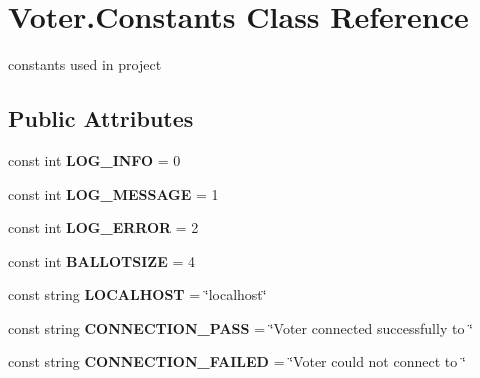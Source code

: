 \hypertarget{class_voter_1_1_constants}{}\section{Voter.\+Constants Class Reference}
\label{class_voter_1_1_constants}


constants used in project  


\subsection*{Public Attributes}
\begin{DoxyCompactItemize}
\item 
\hypertarget{class_voter_1_1_constants_a33c12aa4e1e13ae3ee87ab75edc53fe3}{}const int {\bfseries L\+O\+G\+\_\+\+I\+N\+F\+O} = 0\label{class_voter_1_1_constants_a33c12aa4e1e13ae3ee87ab75edc53fe3}

\item 
\hypertarget{class_voter_1_1_constants_abe1a92600ddc5a13f7ca908984fb76b1}{}const int {\bfseries L\+O\+G\+\_\+\+M\+E\+S\+S\+A\+G\+E} = 1\label{class_voter_1_1_constants_abe1a92600ddc5a13f7ca908984fb76b1}

\item 
\hypertarget{class_voter_1_1_constants_a356a85f02fe93ccb7b9612ed914ea826}{}const int {\bfseries L\+O\+G\+\_\+\+E\+R\+R\+O\+R} = 2\label{class_voter_1_1_constants_a356a85f02fe93ccb7b9612ed914ea826}

\item 
\hypertarget{class_voter_1_1_constants_a4f2d9d253494ffe6bd1a70f94940fe73}{}const int {\bfseries B\+A\+L\+L\+O\+T\+S\+I\+Z\+E} = 4\label{class_voter_1_1_constants_a4f2d9d253494ffe6bd1a70f94940fe73}

\item 
\hypertarget{class_voter_1_1_constants_a4788ffb31932c8917aa5e0ffc01bbcdf}{}const string {\bfseries L\+O\+C\+A\+L\+H\+O\+S\+T} = \char`\"{}localhost\char`\"{}\label{class_voter_1_1_constants_a4788ffb31932c8917aa5e0ffc01bbcdf}

\item 
\hypertarget{class_voter_1_1_constants_a1c088c719ffc685de691d32b7be7c397}{}const string {\bfseries C\+O\+N\+N\+E\+C\+T\+I\+O\+N\+\_\+\+P\+A\+S\+S} = \char`\"{}Voter connected successfully to \char`\"{}\label{class_voter_1_1_constants_a1c088c719ffc685de691d32b7be7c397}

\item 
\hypertarget{class_voter_1_1_constants_a024040b0171a073e021e276e1e8037fc}{}const string {\bfseries C\+O\+N\+N\+E\+C\+T\+I\+O\+N\+\_\+\+F\+A\+I\+L\+E\+D} = \char`\"{}Voter could not connect to \char`\"{}\label{class_voter_1_1_constants_a024040b0171a073e021e276e1e8037fc}


\end{DoxyCompactItemize}
